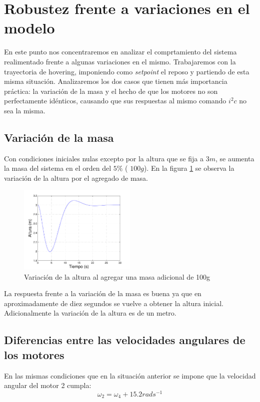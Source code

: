\documentclass[main]{subfiles}
\begin{document}
\section{Robustez frente a variaciones en el modelo}
\label{sec:robustez}

En este punto nos concentraremos en analizar el comprtamiento del sistema realimentado frente a algunas variaciones en el mismo. Trabajaremos con la trayectoria de hovering, imponiendo como \emph{setpoint} el reposo y partiendo de esta misma situaci\'on. Analizaremos los dos casos que tienen m\'as importancia pr\'actica: la variaci\'on de la masa y el hecho de que los motores no son perfectamente id\'enticos, causando que sus respuestas al mismo comando $i^2c$ no sea la misma.
\subsection*{Variaci\'on de la masa}
Con condiciones iniciales nulas excepto por la altura que se fija a $3m$, se aumenta la masa del sistema en el orden del $5\%$ ( $100 g$). En la figura \ref{fig:masa} se observa la variaci\'on de la altura por el agregado de masa.


\begin{figure}[h!]
  \centering
	\includegraphics[width=0.5\textwidth]{./pics_sim_control/robustez/masa.pdf}
  \caption{Variaci\'on de la altura al agregar una masa adicional de 100g}
  \label{fig:masa}
\end{figure}

La respuesta frente a la variaci\'on de la masa es buena ya que en aproximadamente de diez segundos se vuelve a obtener la altura inicial. Adicionalmente la variaci\'on de la altura es de un metro. 

\subsection*{Diferencias entre las velocidades angulares de los motores}

En las mismas condiciones que en la situaci\'on anterior se impone que la velocidad angular del motor 2 cumpla: 
\begin{equation}
\omega_2 = \omega_4 + 15.2rad s^{-1}
\end{equation}
\end{document}
